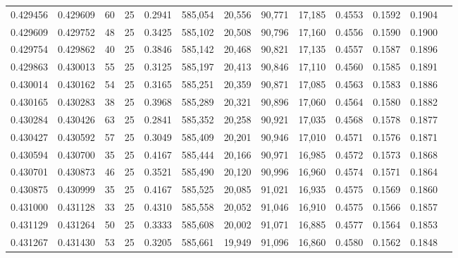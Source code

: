 \begin{tabular}{rrrrrrrrrrrrr}
0.429456 & 0.429609 &    60 &  25 &                                     0.2941 & 585,054 &  20,556 &  90,771 &  17,185 & 0.4553 & 0.1592 & 0.1904 \\
0.429609 & 0.429752 &    48 &  25 &                                     0.3425 & 585,102 &  20,508 &  90,796 &  17,160 & 0.4556 & 0.1590 & 0.1900 \\
0.429754 & 0.429862 &    40 &  25 &                                     0.3846 & 585,142 &  20,468 &  90,821 &  17,135 & 0.4557 & 0.1587 & 0.1896 \\
0.429863 & 0.430013 &    55 &  25 &                                     0.3125 & 585,197 &  20,413 &  90,846 &  17,110 & 0.4560 & 0.1585 & 0.1891 \\
0.430014 & 0.430162 &    54 &  25 &                                     0.3165 & 585,251 &  20,359 &  90,871 &  17,085 & 0.4563 & 0.1583 & 0.1886 \\
0.430165 & 0.430283 &    38 &  25 &                                     0.3968 & 585,289 &  20,321 &  90,896 &  17,060 & 0.4564 & 0.1580 & 0.1882 \\
0.430284 & 0.430426 &    63 &  25 &                                     0.2841 & 585,352 &  20,258 &  90,921 &  17,035 & 0.4568 & 0.1578 & 0.1877 \\
0.430427 & 0.430592 &    57 &  25 &                                     0.3049 & 585,409 &  20,201 &  90,946 &  17,010 & 0.4571 & 0.1576 & 0.1871 \\
0.430594 & 0.430700 &    35 &  25 &                                     0.4167 & 585,444 &  20,166 &  90,971 &  16,985 & 0.4572 & 0.1573 & 0.1868 \\
0.430701 & 0.430873 &    46 &  25 &                                     0.3521 & 585,490 &  20,120 &  90,996 &  16,960 & 0.4574 & 0.1571 & 0.1864 \\
0.430875 & 0.430999 &    35 &  25 &                                     0.4167 & 585,525 &  20,085 &  91,021 &  16,935 & 0.4575 & 0.1569 & 0.1860 \\
0.431000 & 0.431128 &    33 &  25 &                                     0.4310 & 585,558 &  20,052 &  91,046 &  16,910 & 0.4575 & 0.1566 & 0.1857 \\
0.431129 & 0.431264 &    50 &  25 &                                     0.3333 & 585,608 &  20,002 &  91,071 &  16,885 & 0.4577 & 0.1564 & 0.1853 \\
0.431267 & 0.431430 &    53 &  25 &                                     0.3205 & 585,661 &  19,949 &  91,096 &  16,860 & 0.4580 & 0.1562 & 0.1848 \\

\end{tabular}
